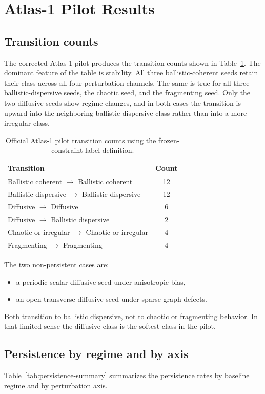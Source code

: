 \documentclass[11pt]{article}
\begin{document}
\section{Atlas-1 Pilot Results}
\subsection{Transition counts}
The corrected Atlas-1 pilot produces the transition counts shown in Table~\ref{tab:transition-counts}. The dominant feature of the table is stability. All three ballistic-coherent seeds retain their class across all four perturbation channels. The same is true for all three ballistic-dispersive seeds, the chaotic seed, and the fragmenting seed. Only the two diffusive seeds show regime changes, and in both cases the transition is upward into the neighboring ballistic-dispersive class rather than into a more irregular class.

\begin{table}[t]
\centering
\begin{tabular}{lc}
\hline
Transition & Count \\
\hline
Ballistic coherent $\rightarrow$ Ballistic coherent & 12 \\
Ballistic dispersive $\rightarrow$ Ballistic dispersive & 12 \\
Diffusive $\rightarrow$ Diffusive & 6 \\
Diffusive $\rightarrow$ Ballistic dispersive & 2 \\
Chaotic or irregular $\rightarrow$ Chaotic or irregular & 4 \\
Fragmenting $\rightarrow$ Fragmenting & 4 \\
\hline
\end{tabular}
\caption{Official Atlas-1 pilot transition counts using the frozen-constraint label definition.}
\label{tab:transition-counts}
\end{table}

The two non-persistent cases are:
\begin{itemize}
\item a periodic scalar diffusive seed under anisotropic bias,
\item an open transverse diffusive seed under sparse graph defects.
\end{itemize}
Both transition to ballistic dispersive, not to chaotic or fragmenting behavior. In that limited sense the diffusive class is the softest class in the pilot.

\subsection{Persistence by regime and by axis}
Table~\ref{tab:persistence-summary} summarizes the persistence rates by baseline regime and by perturbation axis.
\end{document}
